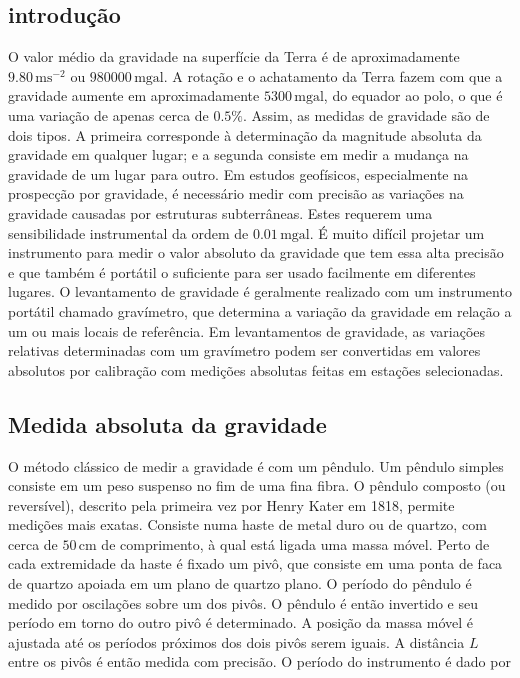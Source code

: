 \documentclass[]{book}
\theoremstyle{definition}
\theoremstyle{definition}
\theoremstyle{definition}
\theoremstyle{remark}
\begin{document}
\hypertarget{introducao}{%
\subsection{introdução}\label{introducao}}

O valor médio da gravidade na superfície da Terra é de aproximadamente \(9.80\,\mathrm{m}\mathrm{s}^{-2}\) ou \(980000\,\mathrm{mgal}\). A rotação e o achatamento da Terra fazem com que a gravidade aumente em aproximadamente \(5300\,\mathrm{mgal}\), do equador ao polo, o que é uma variação de apenas cerca de \(0.5\%\). Assim, as medidas de gravidade são de dois tipos. A primeira corresponde à determinação da magnitude absoluta da gravidade em qualquer lugar; e a segunda consiste em medir a mudança na gravidade de um lugar para outro. Em estudos geofísicos, especialmente na prospecção por gravidade, é necessário medir com precisão as variações na gravidade causadas por estruturas subterrâneas. Estes requerem uma sensibilidade instrumental da ordem de \(0.01\,\mathrm{mgal}\). É muito difícil projetar um instrumento para medir o valor absoluto da gravidade que tem essa alta precisão e que também é portátil o suficiente para ser usado facilmente em diferentes lugares. O levantamento de gravidade é geralmente realizado com um instrumento portátil chamado gravímetro, que determina a variação da gravidade em relação a um ou mais locais de referência. Em levantamentos de gravidade, as variações relativas determinadas com um gravímetro podem ser convertidas em valores absolutos por calibração com medições absolutas feitas em estações selecionadas.

\hypertarget{medida-absoluta-da-gravidade}{%
\subsection{Medida absoluta da gravidade}\label{medida-absoluta-da-gravidade}}

O método clássico de medir a gravidade é com um pêndulo. Um pêndulo simples consiste em um peso suspenso no fim de uma fina fibra. O pêndulo composto (ou reversível), descrito pela primeira vez por Henry Kater em 1818, permite medições mais exatas. Consiste numa haste de metal duro ou de quartzo, com cerca de \(50\,\mathrm{cm}\) de comprimento, à qual está ligada uma massa móvel. Perto de cada extremidade da haste é fixado um pivô, que consiste em uma ponta de faca de quartzo apoiada em um plano de quartzo plano. O período do pêndulo é medido por oscilações sobre um dos pivôs. O pêndulo é então invertido e seu período em torno do outro pivô é determinado. A posição da massa móvel é ajustada até os períodos próximos dos dois pivôs serem iguais. A distância \(L\) entre os pivôs é então medida com precisão. O período do instrumento é dado por
\end{document}
